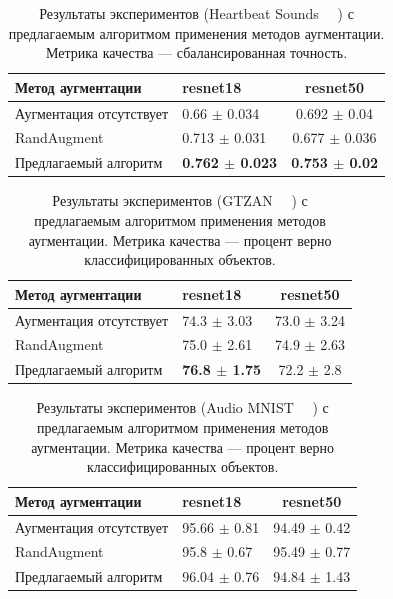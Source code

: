 \documentclass[12pt, fleqn]{article}
\begin{document}
\begin{table}[ht!]
    \centering
	\begin{tabular}{| l | l | c |}
    	\hline
	    Метод аугментации & resnet18 & resnet50 \\ \hline
	    Аугментация отсутствует  & 0.66 $\pm$ 0.034 & 0.692 $\pm$ 0.04 \\ \hline
	    RandAugment ~\cite{RandAugment} & 0.713 $\pm$ 0.031 & 0.677 $\pm$ 0.036 \\ \hline
	    Предлагаемый алгоритм & \textbf{0.762 $\pm$ 0.023} & \textbf{0.753 $\pm$ 0.02} \\ \hline
	\end{tabular}
	\caption{Результаты экспериментов (Heartbeat Sounds ~\cite{HeartbeatSoundsArticle}~\cite{HeartbeatSoundsKaggle}) с предлагаемым алгоритмом применения методов аугментации. Метрика качества --- сбалансированная точность.}
	\label{table:lukianov_pavel_t3}
\end{table}

\begin{table}[ht!]
    \centering
	\begin{tabular}{| l | l | c |}
    	\hline
	    Метод аугментации & resnet18 & resnet50 \\ \hline
	    Аугментация отсутствует  & 74.3 $\pm$ 3.03 & 73.0 $\pm$ 3.24 \\ \hline
	    RandAugment ~\cite{RandAugment} & 75.0 $\pm$ 2.61 & 74.9 $\pm$ 2.63 \\ \hline
	    Предлагаемый алгоритм & \textbf{76.8 $\pm$ 1.75} & 72.2 $\pm$ 2.8 \\ \hline
	\end{tabular}
	\caption{Результаты экспериментов (GTZAN ~\cite{GTZAN_Article}~\cite{GTZAN_kaggle}) с предлагаемым алгоритмом применения методов аугментации. Метрика качества --- процент верно классифицированных объектов.}
	\label{table:lukianov_pavel_t4}
\end{table}

\begin{table}[ht!]
    \centering
	\begin{tabular}{| l | l | c |}
    	\hline
	    Метод аугментации & resnet18 & resnet50 \\ \hline
	    Аугментация отсутствует  & 95.66 $\pm$ 0.81 & 94.49 $\pm$ 0.42 \\ \hline
	    RandAugment ~\cite{RandAugment} & 95.8 $\pm$ 0.67 & 95.49 $\pm$ 0.77 \\ \hline
	    Предлагаемый алгоритм & 96.04 $\pm$ 0.76 & 94.84 $\pm$ 1.43 \\ \hline
	\end{tabular}
	\caption{Результаты экспериментов (Audio MNIST ~\cite{AudioMnistArticle}~\cite{AudioMnistKaggle}) с предлагаемым алгоритмом применения методов аугментации. Метрика качества --- процент верно классифицированных объектов.}
	\label{table:lukianov_pavel_t3}
\end{table}
\end{document}
